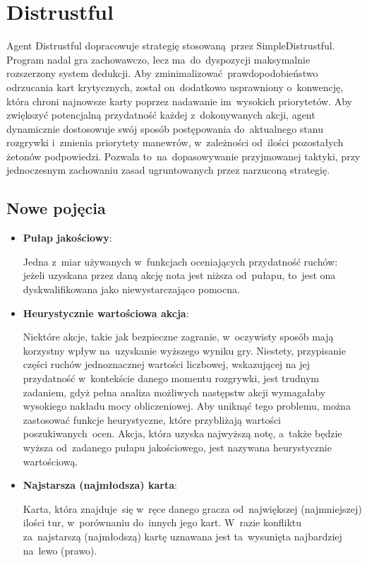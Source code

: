 \documentclass[declaration,shortabstract,inz]{iithesis}
\begin{document}
\section{Distrustful}

Agent Distrustful dopracowuje strategię stosowaną przez SimpleDistrustful. Program nadal gra zachowawczo, lecz ma~do~dyspozycji maksymalnie rozszerzony system dedukcji. Aby zminimalizować prawdopodobieństwo odrzucania kart krytycznych, został on~dodatkowo usprawniony o~konwencję, która chroni najnowsze karty poprzez nadawanie im~wysokich priorytetów. Aby zwiększyć potencjalną przydatność każdej z~dokonywanych akcji, agent dynamicznie dostosowuje swój sposób postępowania do~aktualnego stanu rozgrywki i~zmienia priorytety manewrów, w~zależności od~ilości pozostałych żetonów podpowiedzi. Pozwala to~na~dopasowywanie przyjmowanej taktyki, przy jednoczesnym zachowaniu zasad ugruntowanych przez narzuconą strategię.

\subsection*{Nowe pojęcia}

\begin{itemize}
	\item \textbf{Pułap jakościowy}:
	
	Jedna z~miar używanych w~funkcjach oceniających przydatność ruchów: jeżeli uzyskana przez daną akcję nota jest niższa od~pułapu, to~jest ona dyskwalifikowana jako niewystarczająco pomocna. 

	\item \textbf{Heurystycznie wartościowa akcja}:
	
	Niektóre akcje, takie jak bezpieczne zagranie, w~oczywisty sposób mają korzystny wpływ na~uzyskanie wyższego wyniku gry. Niestety, przypisanie części ruchów jednoznacznej wartości liczbowej, wskazującej na jej przydatność w~kontekście danego momentu rozgrywki, jest trudnym zadaniem, gdyż pełna analiza możliwych następstw akcji wymagałaby wysokiego nakładu mocy obliczeniowej. Aby uniknąć tego problemu, można zastosować funkcje heurystyczne, które przybliżają wartości poszukiwanych~ocen. Akcja, która uzyska najwyższą notę, a~także będzie wyższa od~zadanego pułapu jakościowego, jest nazywana heurystycznie wartościową.
	
	\item \textbf{Najstarsza (najmłodsza) karta}:
	
	Karta, która znajduje~się w~ręce danego gracza od~największej (najmniejszej) ilości tur, w~porównaniu do~innych jego kart. W~razie konfliktu za~najstarszą (najmłodszą) kartę uznawana jest ta~wysunięta najbardziej na~lewo (prawo).

\end{itemize}
\end{document}
